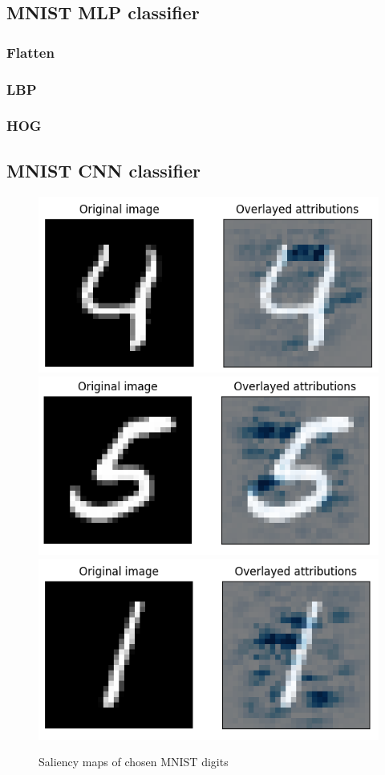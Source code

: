 \documentclass[journal, a4paper]{IEEEtran}
\begin{document}
\subsection{MNIST MLP classifier}\label{subsec:experiment-mnist-mlp}

\subsubsection{Flatten}
\subsubsection{LBP}
\subsubsection{HOG}

\subsection{MNIST CNN classifier}\label{subsec:experiment-mnist-cnn}

\begin{figure}[ht]\centering
    \includegraphics[width=.6\linewidth]{img/saliency_mnist/4.png}
    \includegraphics[width=.6\linewidth]{img/saliency_mnist/5.png}
    \includegraphics[width=.6\linewidth]{img/saliency_mnist/1.png}
    \caption{Saliency maps of chosen MNIST digits}\label{fig:mnist-cnn-saliency}
\end{figure}
\end{document}
